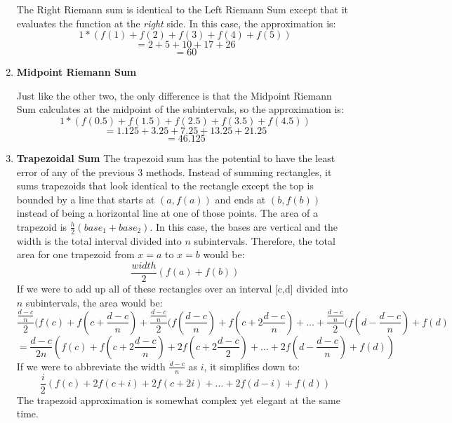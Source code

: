 \documentclass[../revisedmain.tex]{subfiles}
\begin{document}
\begin{enumerate}
\begin{center}
\begin{tikzpicture}
			\end{tikzpicture}
		\end{center}
		The Right Riemann sum is identical to the Left Riemann Sum except that it evaluates the function at the \textit{right} side. In this case, the approximation is:$$1*(f(1)+f(2)+f(3)+f(4)+f(5))$$$$=2+5+10+17+26$$$$=60$$
		\newpage
	\item \textbf{Midpoint Riemann Sum}
		\begin{center}
		\end{center}
		Just like the other two, the only difference is that the Midpoint Riemann Sum calculates at the midpoint of the subintervals, so the approximation is:$$1*(f(0.5)+f(1.5)+f(2.5)+f(3.5)+f(4.5))$$$$=1.125+3.25+7.25+13.25+21.25$$$$=46.125$$
	\newpage		
	\item \textbf{Trapezoidal Sum}
	The trapezoid sum has the potential to have the least error of any of the previous 3 methods. Instead of summing rectangles, it sums trapezoids that look identical to the rectangle except the top is bounded by a line that starts at $(a,f(a))$ and ends at $(b,f(b))$ instead of being a horizontal line at one of those points. The area of a trapezoid is $\displaystyle\frac{h}{2} (base_1+base_2)$. In this case, the bases are vertical and the width is the total interval divided into $n$ subintervals. Therefore, the total area for one trapezoid from $x=a$ to $x=b$ would be:$$\frac{width}{2} (f(a)+f(b))$$ If we were to add up all of these rectangles over an interval [c,d] divided into $n$ subintervals, the area would be:$$\frac{\frac{d-c}{n}}{2} (f(c)+f(c+\frac{d-c}{n})+\frac{\frac{d-c}{n}}{2} (f(\frac{d-c}{n})+f(c+2\frac{d-c}{n})+\dots+\frac{\frac{d-c}{n}}{2} (f(d-\frac{d-c}{n})+f(d)$$$$=\frac{d-c}{2n}\left(f(c)+f(c+2\frac{d-c}{n})+2f(c+2\frac{d-c}{2})+\dots+2f(d-\frac{d-c}{n})+f(d)\right)$$If we were to abbreviate the width $\displaystyle\frac{d-c}{n}$ as $i$, it simplifies down to:$$\frac{i}{2}\left(f(c)+2f(c+i)+2f(c+2i)+\dots+2f(d-i)+f(d)\right)$$The trapezoid approximation is somewhat complex yet elegant at the same time.
\end{enumerate}
\end{document}
